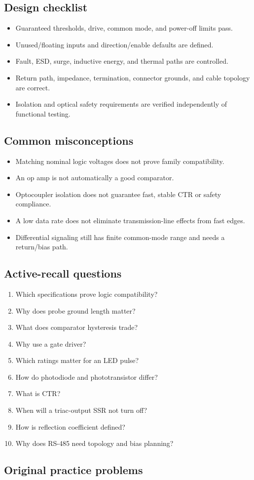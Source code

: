 \documentclass[10pt,letterpaper]{article}
\begin{document}
\subsection{Design checklist}
\begin{itemize}
  \item Guaranteed thresholds, drive, common mode, and power-off limits pass.
  \item Unused/floating inputs and direction/enable defaults are defined.
  \item Fault, ESD, surge, inductive energy, and thermal paths are controlled.
  \item Return path, impedance, termination, connector grounds, and cable topology are correct.
  \item Isolation and optical safety requirements are verified independently of functional testing.
\end{itemize}\subsection{Common misconceptions}
\begin{itemize}
  \item Matching nominal logic voltages does not prove family compatibility.
  \item An op amp is not automatically a good comparator.
  \item Optocoupler isolation does not guarantee fast, stable CTR or safety compliance.
  \item A low data rate does not eliminate transmission-line effects from fast edges.
  \item Differential signaling still has finite common-mode range and needs a return/bias path.
\end{itemize}\subsection{Active-recall questions}
\begin{enumerate}
  \item Which specifications prove logic compatibility?
  \item Why does probe ground length matter?
  \item What does comparator hysteresis trade?
  \item Why use a gate driver?
  \item Which ratings matter for an LED pulse?
  \item How do photodiode and phototransistor differ?
  \item What is CTR?
  \item When will a triac-output SSR not turn off?
  \item How is reflection coefficient defined?
  \item Why does RS-485 need topology and bias planning?
\end{enumerate}\subsection{Original practice problems}
\end{document}
